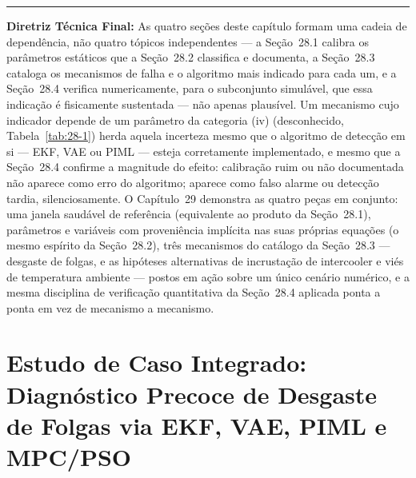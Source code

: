 \documentclass[12pt,a4paper]{article}
\numberwithin{equation}{section}
\numberwithin{table}{section}
\numberwithin{figure}{section}
\begin{document}
\vspace{1em}
\hrule
\vspace{1em}

\textbf{Diretriz Técnica Final:} As quatro seções deste capítulo formam uma cadeia de dependência, não quatro tópicos independentes — a Seção~28.1 calibra os parâmetros estáticos que a Seção~28.2 classifica e documenta, a Seção~28.3 cataloga os mecanismos de falha e o algoritmo mais indicado para cada um, e a Seção~28.4 verifica numericamente, para o subconjunto simulável, que essa indicação é fisicamente sustentada — não apenas plausível. Um mecanismo cujo indicador depende de um parâmetro da categoria (iv) (desconhecido, Tabela~\ref{tab:28-1}) herda aquela incerteza mesmo que o algoritmo de detecção em si — EKF, VAE ou PIML — esteja corretamente implementado, e mesmo que a Seção~28.4 confirme a magnitude do efeito: calibração ruim ou não documentada não aparece como erro do algoritmo; aparece como falso alarme ou detecção tardia, silenciosamente. O Capítulo~29 demonstra as quatro peças em conjunto: uma janela saudável de referência (equivalente ao produto da Seção~28.1), parâmetros e variáveis com proveniência implícita nas suas próprias equações (o mesmo espírito da Seção~28.2), três mecanismos do catálogo da Seção~28.3 — desgaste de folgas, e as hipóteses alternativas de incrustação de intercooler e viés de temperatura ambiente — postos em ação sobre um único cenário numérico, e a mesma disciplina de verificação quantitativa da Seção~28.4 aplicada ponta a ponta em vez de mecanismo a mecanismo.



\clearpage
\section{Estudo de Caso Integrado: Diagnóstico Precoce de Desgaste de Folgas via EKF, VAE, PIML e MPC/PSO}

\end{document}
